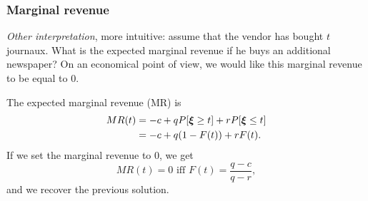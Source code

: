 \documentclass{beamer}
\begin{document}
\begin{frame}
\frametitle{Marginal revenue}

{\sl Other interpretation}, more intuitive: assume that the vendor has bought $t$ journaux.
What is the expected marginal revenue if he buys an additional newspaper?
On an economical point of view, we would like this marginal revenue to be equal to 0.

\mbox{}

The expected marginal revenue (MR) is
\begin{align*}
MR(t) &= -c + qP[{\boldsymbol{\xi}} \geq t] + rP[{\boldsymbol{\xi}} \leq t]\\
&= -c + q(1-F(t)) + rF(t).
\end{align*}
If we set the marginal revenue to 0, we get
$$
MR(t) = 0 \mbox{ iff } F(t) = \frac{q-c}{q-r},
$$
and we recover the previous solution.


\end{frame}
\end{document}
